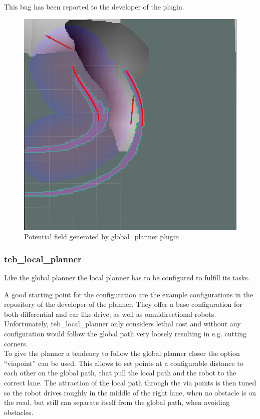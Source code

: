  This bug has been reported to the developer of the plugin. 
 \begin{figure} [H]
 	\centering
 	\includegraphics[width=.7\textwidth]{Pictures/out of bounds}	
 	
 	\caption{Potential field generated by global\_planner plugin}
 	\label{potentialfield}
 \end{figure}
 
 \subsubsection{teb\_local\_planner}
Like the global planner the local planner has to be configured to fulfill its tasks.

A good starting point for the configuration are the example configurations in the repository of the developer of the planner\cite{tebtutorials}. They offer a base configuration for both differential and car like drive, as well as omnidirectional robots.\\

Unfortunately, teb\_local\_planner only considers lethal cost and without any configuration would follow the global path very loosely resulting in e.g. cutting corners.\\ 

To give the planner a tendency to follow the global planner closer the option ``viapoint'' can be used. This allows to set points at a configurable distance to each other on the global path, that pull the local path and the robot to the correct lane. The attraction of the local path through the via points is then tuned so the robot drives roughly in the middle of the right lane, when no obstacle is on the road, but still can separate itself from the global path, when avoiding obstacles.\\

